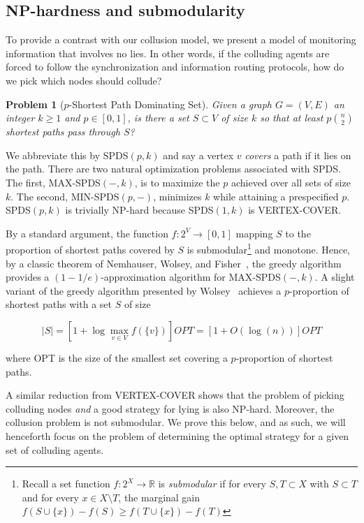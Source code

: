 \documentclass[prodmode,acmec]{ec-acmsmall}
\newtheorem{problem}{Problem}
\begin{document}
\subsection{NP-hardness and submodularity} \label{sec:combinatorial}

To provide a contrast with our collusion model, we present a model of
monitoring information that involves no lies. In other words, if the colluding
agents are forced to follow the synchronization and information routing 
protocols, how do we pick which nodes should collude?

\begin{problem}[$p$-Shortest Path Dominating Set] \label{prob:spds}
Given a graph $G = (V,E)$ an integer $k \geq 1$ and $p \in [0,1]$, is there a
set $S \subset V$ of size $k$ so that at least $p \binom{n}{2}$ shortest paths
pass through $S$?
\end{problem}

We abbreviate this by SPDS$(p,k)$ and say a vertex $v$ \emph{covers} a path if
it lies on the path. There are two natural optimization problems associated
with SPDS. The first, MAX-SPDS$(-,k)$, is to maximize the $p$ achieved over all
sets of size $k$. The second, MIN-SPDS$(p,-)$, minimizes $k$ while attaining a
prespecified $p$. SPDS$(p,k)$ is trivially NP-hard because SPDS$(1, k)$ is
VERTEX-COVER.
 
By a standard argument, the function $f: 2^V \to [0,1]$ mapping $S$ to the
proportion of shortest paths covered by $S$ is submodular\footnote{Recall a set
function $f:2^X \to \mathbb{R}$ is \emph{submodular} if for every $S, T \subset
X$ with $S \subset T$ and for every $x \in X \setminus T$, the marginal gain
$f(S \cup \{ x \}) - f(S) \geq f(T \cup \{ x \}) - f(T)$} and monotone.  Hence,
by a classic theorem of Nemhauser, Wolsey, and Fisher~\cite{NemhauserWF78}, the
greedy algorithm provides a $(1-1/e)$-approximation algorithm for
MAX-SPDS$(-,k)$. A slight variant of the greedy algorithm presented by
Wolsey~\cite{Wolsey82} achieves a $p$-proportion of shortest paths with a set
$S$ of size

$$ |S| = \left [ 1 + \log \max_{v \in V} f(\{ v \}) \right ] OPT
       = \left [ 1 + O(\log(n)) \right ] OPT$$

where OPT is the size of the smallest set covering a $p$-proportion of shortest
paths. 

A similar reduction from VERTEX-COVER shows that the problem of picking
colluding nodes \emph{and} a good strategy for lying is also NP-hard. Moreover,
the collusion problem is not submodular. We prove this below, and as such, we
will henceforth focus on the problem of determining the optimal strategy for a
given set of colluding agents.
\end{document}
